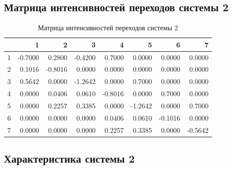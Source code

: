 \documentclass{article}
\begin{document}
\subsection*{Матрица интенсивностей переходов системы 2}
\begin{table}[H]
    \centering
    \begin{tabular}{c|rrrrrrr}
        & 1 & 2 & 3 & 4 & 5 & 6 & 7 \\
        \hline
        1 & -0.7000 & 0.2800 & -0.4200 & 0.7000 & 0.0000 & 0.0000 & 0.0000 \\
        2 & 0.1016 & -0.8016 & 0.0000 & 0.0000 & 0.0000 & 0.0000 & 0.0000 \\
        3 & 0.5642 & 0.0000 & -1.2642 & 0.0000 & 0.7000 & 0.0000 & 0.0000 \\
        4 & 0.0000 & 0.0406 & 0.0610 & -0.8016 & 0.0000 & 0.7000 & 0.0000 \\
        5 & 0.0000 & 0.2257 & 0.3385 & 0.0000 & -1.2642 & 0.0000 & 0.7000 \\
        6 & 0.0000 & 0.0000 & 0.0000 & 0.0406 & 0.0610 & -0.1016 & 0.0000 \\
        7 & 0.0000 & 0.0000 & 0.0000 & 0.2257 & 0.3385 & 0.0000 & -0.5642
    \end{tabular}
    \caption{Матрица интенсивностей переходов системы 2}
    \label{tab:intensity_matrix_2}
\end{table}

\subsection*{Характеристика системы 2}
\end{document}
